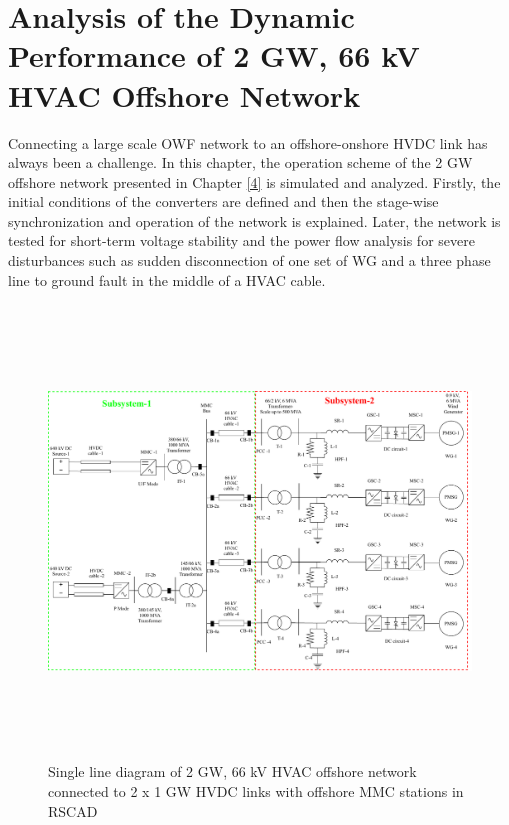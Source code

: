 \chapter{Analysis of the Dynamic Performance of 2 GW, 66 kV HVAC Offshore Network}\label{5}

Connecting a large scale \gls{OWF} network to an offshore-onshore \gls{HVDC} link has always been a challenge. In this chapter, the operation scheme of the 2 GW offshore network presented in Chapter \ref{4} is simulated and analyzed. Firstly, the initial conditions of the converters are defined and then the stage-wise synchronization and operation of the network is explained. Later, the network is tested for short-term voltage stability and the power flow analysis for severe disturbances such as sudden disconnection of one set of \gls{WG} and a three phase line to ground fault in the middle of a \gls{HVAC} cable.

\begin{figure}[H]
\centering
    \includegraphics[height = 12cm,width = 17cm]{Diagrams/Chapter_4/WT4_MMC2_new.pdf}
    \caption{Single line diagram of 2 GW, 66 kV HVAC offshore network connected to 2 x 1 GW HVDC links with offshore MMC stations in RSCAD}
    \label{fig:WT4_MMC2_Chap5}
\end{figure}

